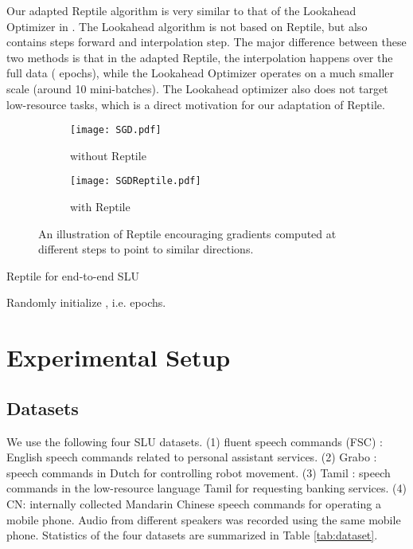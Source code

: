 \documentclass[a4paper]{article}
\begin{document}
	
	Our adapted Reptile algorithm is very similar to that of the Lookahead Optimizer in \cite{lookahead}. The Lookahead algorithm is not based on Reptile, but also contains  steps forward and  interpolation step. The major difference between these two methods is that in the adapted Reptile, the interpolation happens over the full data ( epochs), while the Lookahead Optimizer operates on a much smaller scale (around 10 mini-batches). The Lookahead optimizer also does not target low-resource tasks, which is a direct motivation for our adaptation of Reptile.
	\begin{figure}
		\centering
		\begin{subfigure}{.2\textwidth}
			\centering
			\texttt{[image: SGD.pdf]}
			\caption{without Reptile}
			\label{fig:sub1}
		\end{subfigure}\begin{subfigure}{.2\textwidth}
			\centering
			\texttt{[image: SGDReptile.pdf]}
			\caption{with Reptile}
			\label{fig:sub2}
		\end{subfigure}
		\caption{An illustration of Reptile encouraging gradients computed at different steps to point to similar directions.}
		\label{fig:Ksteps}
	\end{figure}
	
	
	\begin{algorithm}[t]
		\caption{Reptile for end-to-end SLU}
		\begin{algorithmic}[1]
			\STATE Randomly initialize 
			, i.e.  epochs.
			\ENDWHILE
		\end{algorithmic}
	\end{algorithm}
	
	\section{Experimental Setup}
	\subsection{Datasets}
	We use the following four SLU datasets. (1) fluent speech commands (FSC) \cite{Lugosch2019}: English speech commands related to personal assistant services. (2) Grabo \cite{Grabo}: speech commands in Dutch for controlling robot movement. (3) Tamil \cite{karunanayake-etal-2019-transfer}: speech commands in the low-resource language Tamil for requesting banking services. (4) CN: internally collected Mandarin Chinese speech commands for operating a mobile phone. Audio from different speakers was recorded using the same mobile phone. Statistics of the four datasets are summarized in Table \ref{tab:dataset}.
	
\end{document}
